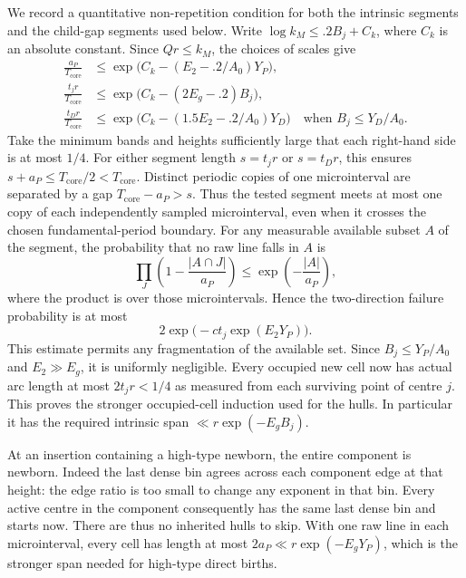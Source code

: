 We record a quantitative non-repetition condition for both the
intrinsic segments and the child-gap segments used below.  Write
$\log k_M\le .2B_j+C_k$, where $C_k$ is an absolute constant.
Since $Qr\le k_M$, the choices of scales give
\[
 \begin{aligned}
  \frac{a_P}{T_{\mathrm{core}}}&\le
       \exp\bigl(C_k-(E_2-.2/A_0)Y_P\bigr),\\
  \frac{t_jr}{T_{\mathrm{core}}}&\le
       \exp\bigl(C_k-(2E_g-.2)B_j\bigr),\\
  \frac{t_Dr}{T_{\mathrm{core}}}&\le
       \exp\bigl(C_k-(1.5E_2-.2/A_0)Y_D\bigr)
       \quad\text{when }B_j\le Y_D/A_0.
 \end{aligned}
\]
Take the minimum bands and heights sufficiently large that each
right-hand side is at most $1/4$.  For either segment length
$s=t_jr$ or $s=t_Dr$, this ensures
$s+a_P\le T_{\mathrm{core}}/2<T_{\mathrm{core}}$.
Distinct periodic copies of one microinterval are separated by
a gap $T_{\mathrm{core}}-a_P>s$.  Thus the tested segment meets at most one
copy of each independently sampled microinterval, even when it
crosses the chosen fundamental-period boundary.  For any
measurable available subset $A$ of the segment, the probability
that no raw line falls in $A$ is
\[
 \prod_J\left(1-\frac{|A\cap J|}{a_P}\right)
 \le \exp\left(-\frac{|A|}{a_P}\right),
\]
where the product is over those microintervals.  Hence the
two-direction failure probability is at most
\begin{equation}
 2\exp\bigl(-c t_j\exp(E_2Y_P)\bigr).
\label{part:intrinsic-jitter}
\end{equation}
This estimate permits any fragmentation of the available set.
Since $B_j\le Y_P/A_0$ and $E_2\gg E_g$, it is uniformly
negligible.  Every occupied new cell now has actual arc length at
most $2t_jr<1/4$ as measured from each surviving point of centre $j$.
This proves the stronger occupied-cell induction used for the hulls.
In particular it has the required intrinsic span
$\ll r\exp(-E_gB_j)$.

At an insertion containing a high-type newborn, the entire
component is newborn.  Indeed the last dense bin agrees across
each component edge at that height: the edge ratio is too small
to change any exponent in that bin.  Every active centre in the
component consequently has the same last dense bin and starts
now.  There are thus no inherited hulls to skip.  With one raw
line in each microinterval, every cell has length at most
$2a_P\ll r\exp(-E_gY_P)$, which is the stronger span needed
for high-type direct births.

